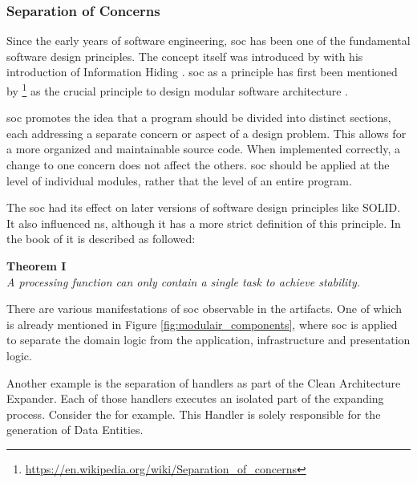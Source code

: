 \subsubsection{Separation of Concerns}

Since the early years of software engineering, \gls{soc} has been one of the fundamental
software design principles. The concept itself was introduced by
\citeauthor{parnas_criteria_1972} with his introduction of Information Hiding
\parencite{parnas_criteria_1972}. \gls{soc} as a principle has first been mentioned by
\citeauthor{dijkstra_selected_1982}\footnote{\url{https://en.wikipedia.org/wiki/Separation_of_concerns}}
as the crucial principle to design modular software architecture
\parencite[]{dijkstra_selected_1982}. 

\gls{soc} promotes the idea that a program should be divided into distinct sections, each
addressing a separate concern or aspect of a design problem. This allows for a more
organized and maintainable source code. When implemented correctly, a change to one
concern does not affect the others. \gls{soc} should be applied at the level of individual
modules, rather that the level of an entire program.

The \gls{soc} had its effect on later versions of software design principles like SOLID.
It also influenced \gls{ns}, although it has a more strict definition of this principle.
In the book of \citeauthor{mannaert_normalized_2016} it is described as followed: 

\begin{tcolorbox}
    \begin{center}
        \textbf{Theorem I}\\
        \textit{A processing function can only contain a single task to achieve stability.}    
    \end{center}        
\end{tcolorbox}

There are various manifestations of \gls{soc} observable in the artifacts. One of which is
already mentioned in Figure \ref{fig:modulair_components}, where \gls{soc} is applied to
separate the domain logic from the application, infrastructure and presentation logic.

Another example is the separation of handlers as part of the Clean Architecture Expander.
Each of those handlers executes an isolated part of the expanding process. Consider the
\parencite{koks_expandentitieshandlerinteractor_2023} for example. This Handler is solely
responsible for the generation of Data Entities. 

